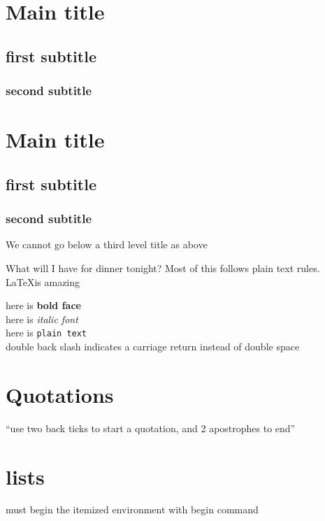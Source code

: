 \documentclass{article}\usepackage[]{graphicx}\usepackage[]{color}
\begin{document}


\section*{Main title}

\subsection*{first subtitle}

\subsubsection*{second subtitle}

\section{Main title}

\subsection{first subtitle}

\subsubsection{second subtitle}

We cannot go below a third level title as above

What will I have for dinner tonight? Most of this follows plain text rules. \LaTeX is amazing


here is \textbf{bold face}\\
here is \textit{italic font}\\
here is \texttt{plain text}\\
double back slash indicates a carriage return instead of double space


\section*{Quotations}

``use two back ticks to start a quotation, and 2 apostrophes to end''

\section*{lists}

must begin the itemized environment with begin command
\end{document}
